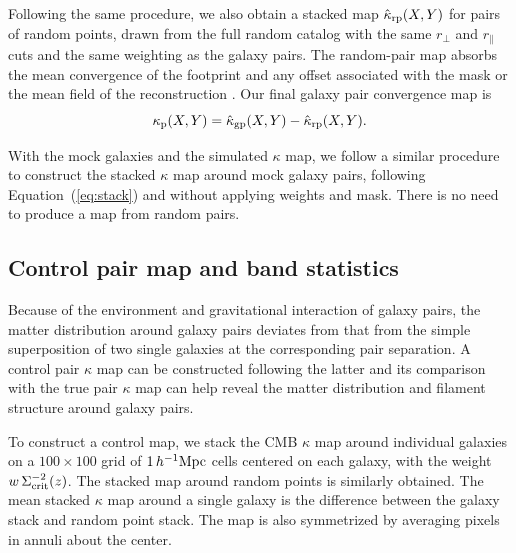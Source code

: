 \documentclass[twocolumn,anonymous,linenumbers]{aastex701}
\newcommand{\hinvMpc}{h^{-1}{\rm Mpc}}
\begin{document}
Following the same procedure, we also obtain a stacked map $\hat\kappa_{\rm rp}(X,Y)$ for pairs of random points, drawn from the full random catalog with the same $r_{\perp}$ and $r_{\parallel}$ cuts and the same weighting as the galaxy pairs. The random-pair map absorbs the mean convergence of the footprint and any offset associated with the mask or the mean field of the reconstruction \citep[e.g.,][]{Singh2017}. Our final galaxy pair convergence map is 
\begin{equation}
    \kappa_{\rm p}(X,Y) 
    = \hat\kappa_{\rm gp}(X,Y) -\hat\kappa_{\rm rp}(X,Y).
\end{equation}

With the mock galaxies and the simulated $\kappa$ map, we follow a similar procedure to construct the stacked $\kappa$ map around mock galaxy pairs, following Equation~(\ref{eq:stack}) and without applying weights and mask. There is no need to produce a map from random pairs. 

\subsection{Control pair map and band statistics}
\label{sec:control}

Because of the environment and gravitational interaction of galaxy pairs, the matter distribution around galaxy pairs deviates from that from the simple superposition of two single galaxies at the corresponding pair separation. A control pair $\kappa$ map can be constructed following the latter and its comparison with the true pair $\kappa$ map can help reveal the matter distribution and filament structure around galaxy pairs.

To construct a control map, we stack the CMB $\kappa$ map around individual galaxies on a $100\times100$ grid of $1\,\hinvMpc$ cells
centered on each galaxy, with the weight $w\,\Sigma_{\rm crit}^{-2}(z)$. The stacked map around random points is similarly obtained. The mean stacked $\kappa$ map around a single galaxy is the difference between the galaxy stack and random point stack. The map is also symmetrized by averaging pixels in annuli about the center.
\end{document}
